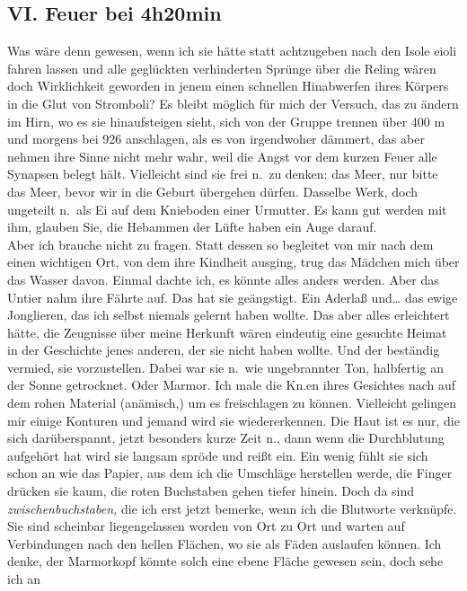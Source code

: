 \documentclass[
]{article}
\author{}
\date{\vspace{-2.5em}}
\begin{document}
\subsection{VI. Feuer bei 4h20min}\label{vi.-feuer-bei-4h20min}

Was wäre denn gewesen, wenn ich sie hätte statt achtzugeben nach den
Isole eioli fahren lassen und alle geglückten verhinderten Sprünge über
die Reling wären doch Wirklichkeit geworden in jenem einen schnellen
Hinabwerfen ihres Körpers in die Glut von Stromboli? Es bleibt möglich
für mich der Versuch, das zu ändern im Hirn, wo es sie hinaufsteigen
sieht, sich von der Gruppe trennen über 400 m und morgens bei 926
anschlagen, als es von irgendwoher dämmert, das aber nehmen ihre Sinne
nicht mehr wahr, weil die Angst vor dem kurzen Feuer alle Synapsen
belegt hält. Vielleicht sind sie frei n.~zu denken: das Meer, nur bitte
das Meer, bevor wir in die Geburt übergehen dürfen. Dasselbe Werk, doch
ungeteilt n.~als Ei auf dem Knieboden einer Urmutter. Es kann gut werden
mit ihm, glauben Sie, die Hebammen der Lüfte haben ein Auge darauf.\\
Aber ich brauche nicht zu fragen. Statt dessen so begleitet von mir nach
dem einen wichtigen Ort, von dem ihre Kindheit ausging, trug das Mädchen
mich über das Wasser davon. Einmal dachte ich, es könnte alles anders
werden. Aber das Untier nahm ihre Fährte auf. Das hat sie geängstigt.
Ein Aderlaß und\ldots{} das ewige Jonglieren, das ich selbst niemals
gelernt haben wollte. Das aber alles erleichtert hätte, die Zeugnisse
über meine Herkunft wären eindeutig eine gesuchte Heimat in der
Geschichte jenes anderen, der sie nicht haben wollte. Und der beständig
vermied, sie vorzustellen. Dabei war sie n.~wie ungebrannter Ton,
halbfertig an der Sonne getrocknet. Oder Marmor. Ich male die Kn.en
ihres Gesichtes nach auf dem rohen Material (anämisch,) um es
freischlagen zu können. Vielleicht gelingen mir einige Konturen und
jemand wird sie wiedererkennen. Die Haut ist es nur, die sich
darüberspannt, jetzt besonders kurze Zeit n., dann wenn die Durchblutung
aufgehört hat wird sie langsam spröde und reißt ein. Ein wenig fühlt sie
sich schon an wie das Papier, aus dem ich die Umschläge herstellen
werde, die Finger drücken sie kaum, die roten Buchstaben gehen tiefer
hinein. Doch da sind \emph{zwischenbuchstaben,} die ich erst jetzt
bemerke, wenn ich die Blutworte verknüpfe. Sie sind scheinbar
liegengelassen worden von Ort zu Ort und warten auf Verbindungen nach
den hellen Flächen, wo sie als Fäden auslaufen können. Ich denke, der
Marmorkopf könnte solch eine ebene Fläche gewesen sein, doch sehe ich an
\end{document}
